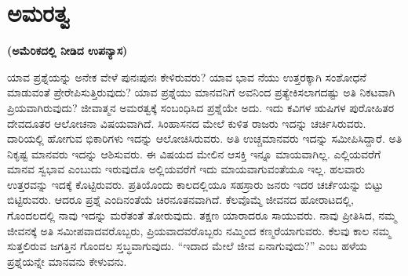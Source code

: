 \chapter{ಅಮರತ್ವ}

\centerline{\textbf{(ಅಮೆರಿಕದಲ್ಲಿ ನೀಡಿದ ಉಪನ್ಯಾಸ)}}

ಯಾವ ಪ್ರಶ್ನೆಯನ್ನು ಅನೇಕ ವೇಳೆ ಪುನಃಪುನಃ ಕೇಳಿರುವರು? ಯಾವ ಭಾವ ನೆಯು ಉತ್ತರಕ್ಕಾಗಿ ಸಂಶೋಧನೆ ಮಾಡುವಂತೆ ಪ್ರೇರೇಪಿಸುತ್ತಿರುವುದು? ಯಾವ ಪ್ರಶ್ನೆಯು ಮಾನವನಿಗೆ ಅವನಿಂದ ಪ್ರತ್ಯೇಕಿಸಲಾಗದಷ್ಟು ಅತಿ ನಿಕಟವಾಗಿ ಪ್ರಿಯವಾಗಿರುವುದು? ಜೀವಾತ್ಮನ ಅಮರತ್ವಕ್ಕೆ ಸಂಬಂಧಿಸಿದ ಪ್ರಶ್ನೆಯೇ ಅದು. ಇದು ಕವಿಗಳ ಋಷಿಗಳ ಪುರೋಹಿತರ ದೇವದೂತರ ಆಲೋಚನಾ ವಿಷಯವಾಗಿದೆ. ಸಿಂಹಾಸನದ ಮೇಲೆ ಕುಳಿತ ರಾಜರು ಇದನ್ನು ಚರ್ಚಿಸಿರುವರು. ದಾರಿಯಲ್ಲಿ ಹೋಗುವ ಭಿಕಾರಿಗಳು ಇದನ್ನು ಆಲೋಚಿಸಿರುವರು. ಅತಿ ಉಚ್ಚಮಾನವರು ಇದನ್ನು ಸಮೀಪಿಸಿದ್ದಾರೆ. ಅತಿ ನಿಕೃಷ್ಟ ಮಾನವರು ಇದನ್ನು ಆಶಿಸುವರು. ಈ ವಿಷಯದ ಮೇಲಿನ ಆಸಕ್ತಿ ಇನ್ನೂ ಮಾಯವಾಗಿಲ್ಲ. ಎಲ್ಲಿಯವರೆಗೆ ಮಾನವ ಸ್ವಭಾವ ಎಂಬುದು ಇರುವುದೊ ಅಲ್ಲಿಯವರೆಗೆ ಇದು ಮಾಯವಾಗುವಂತೆಯೂ ಇಲ್ಲ. ಹಲವಾರು ಉತ್ತರವನ್ನು ಇದಕ್ಕೆ ಕೊಟ್ಟಿರುವರು. ಪ್ರತಿಯೊಂದು ಕಾಲದಲ್ಲಿಯೂ ಸಹಸ್ರಾರು ಜನರು ಇದರ ಚರ್ಚೆಯನ್ನು ಬಿಟ್ಟು ಬಿಟ್ಟಿರುವರು. ಆದರೂ ಪ್ರಶ್ನೆ ಎಂದಿನಂತೆಯೆ ಚಿರನೂತನವಾಗಿದೆ. ಕೆಲವೊಮ್ಮೆ ಜೀವನದ ಹೋರಾಟದಲ್ಲಿ, ಗೊಂದಲದಲ್ಲಿ ನಾವು ಇದನ್ನು ಮರೆತಂತೆ ತೋರುವುದು. ತಕ್ಷಣ ಯಾರಾದರೂ ಸಾಯುವರು. ನಾವು ಪ್ರೀತಿಸಿದ, ನಮ್ಮ ಜೀವನಕ್ಕೆ ಅತಿ ಸಮೀಪವಾದವರೊಬ್ಬರು, ಪ್ರಿಯವಾದವರೊಬ್ಬರು ನಮ್ಮಿಂದ ಕಣ್ಮರೆಯಾಗುವರು. ಕೆಲವು ಕಾಲ ನಮ್ಮ ಸುತ್ತಲಿರುವ ಜಗತ್ತಿನ ಗೊಂದಲ ಸ್ತಬ್ಧವಾಗುವುದು. “ಇದಾದ ಮೇಲೆ ಜೀವ ಏನಾಗುವುದು?” ಎಂಬ ಹಳೆಯ ಪ್ರಶ್ನೆಯನ್ನೇ ಮಾನವನು ಕೇಳುವನು.

